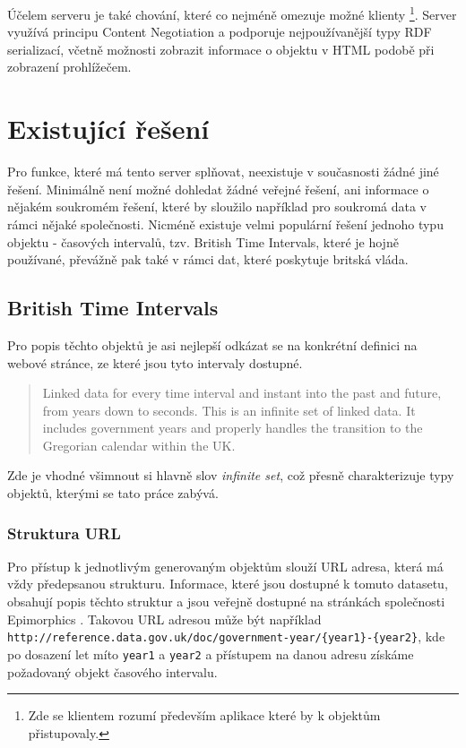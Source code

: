 \documentclass[thesis=B,czech]{FITthesis}[2012/06/26]
\begin{document}
Účelem serveru je také chování, které co nejméně omezuje možné klienty \footnote{Zde se klientem rozumí především aplikace které by k objektům přistupovaly.}.
Server využívá principu Content Negotiation \cite{content_negotiation} a podporuje nejpoužívanější typy RDF serializací, včetně možnosti zobrazit informace 
o objektu v HTML podobě při zobrazení prohlížečem.


\section{Existující řešení}
Pro funkce, které má tento server splňovat, neexistuje v současnosti žádné jiné řešení. Minimálně není možné dohledat 
  žádné veřejné řešení, ani informace o nějakém soukromém řešení, které by sloužilo například pro soukromá data v rámci nějaké společnosti. 
  Nicméně existuje velmi populární řešení jednoho typu objektu - časových intervalů, tzv. British Time Intervals, které je hojně používané,
  převážně pak také v rámci dat, které poskytuje britská vláda.
  
\subsection{British Time Intervals}
Pro popis těchto objektů je asi nejlepší odkázat se na konkrétní definici na webové stránce, ze které jsou tyto intervaly dostupné.\cite{british_ti}
\begin{quote}
 Linked data for every time interval and instant into the past and future, from years down to seconds.
 This is an infinite set of linked data. It includes government years and properly handles the transition to the Gregorian calendar within the UK.
\end{quote}
 Zde je vhodné všimnout si hlavně slov \textit{infinite set}, což přesně charakterizuje typy objektů, kterými se tato práce zabývá.

 \subsubsection{Struktura URL} Pro přístup k jednotlivým generovaným objektům slouží URL adresa, která má vždy předepsanou strukturu. Informace, které jsou dostupné
k tomuto datasetu, obsahují popis těchto struktur a jsou veřejně dostupné na stránkách společnosti Epimorphics \cite{ti_structure}. Takovou URL adresou může být například 
\texttt{http://reference.data.gov.uk/doc/government-year/\{year1\}-\{year2\}}, kde po dosazení let míto \texttt{year1} a \texttt{year2} a přístupem na danou adresu získáme požadovaný 
objekt časového intervalu.
\end{document}
